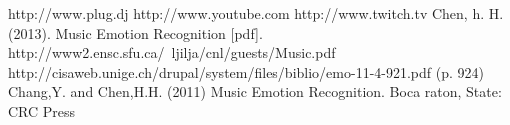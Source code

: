 \documentclass[10pt,a4paper]{article}
\begin{document}
\begin{thebibliography}{10}
 http://www.plug.dj
 http://www.youtube.com
 http://www.twitch.tv
 Chen, h. H. (2013). Music Emotion Recognition [pdf]. http://www2.ensc.sfu.ca/~ljilja/cnl/guests/Music.pdf
 http://cisaweb.unige.ch/drupal/system/files/biblio/emo-11-4-921.pdf (p. 924)
 Chang,Y. and Chen,H.H. (2011) Music Emotion Recognition. Boca raton, State: CRC Press %

\end{thebibliography}
\end{document}
